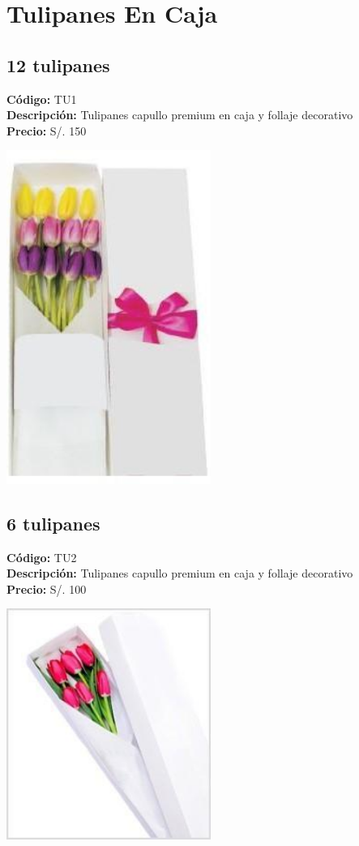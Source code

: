 \section*{Tulipanes En Caja}
\subsection*{12 tulipanes}
\textbf{Código:} TU1 \\
\textbf{Descripción:} Tulipanes capullo premium en caja y follaje decorativo \\
\textbf{Precio:} S/. 150 \\
\begin{center}
\includegraphics[width=0.5\textwidth]{imagenes_extraidas/image_2_3}
\end{center}
\subsection*{6 tulipanes}
\textbf{Código:} TU2 \\
\textbf{Descripción:} Tulipanes capullo premium en caja y follaje decorativo \\
\textbf{Precio:} S/. 100 \\
\begin{center}
\includegraphics[width=0.5\textwidth]{imagenes_extraidas/image_2_4}
\end{center}
